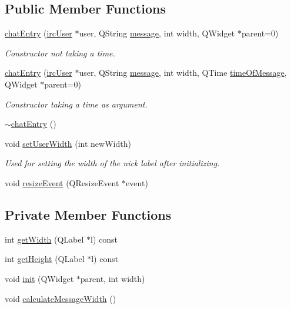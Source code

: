 \subsection*{Public Member Functions}
\begin{DoxyCompactItemize}
\item 
\hyperlink{classclient_1_1chat_entry_a242327cb4a358fdbc182147d2fadf00c}{chat\-Entry} (\hyperlink{classclient_1_1irc_user}{irc\-User} $\ast$user, Q\-String \hyperlink{classclient_1_1chat_entry_acfae1b7b634153673eae05866945cba8}{message}, int width, Q\-Widget $\ast$parent=0)
\begin{DoxyCompactList}\small\item\em Constructor not taking a time. \end{DoxyCompactList}\item 
\hyperlink{classclient_1_1chat_entry_a0e3b3fa3e530a8ddfe86c2c714620dc3}{chat\-Entry} (\hyperlink{classclient_1_1irc_user}{irc\-User} $\ast$user, Q\-String \hyperlink{classclient_1_1chat_entry_acfae1b7b634153673eae05866945cba8}{message}, int width, Q\-Time \hyperlink{classclient_1_1chat_entry_a935d9a9755f8c46eb97723ba296c2b30}{time\-Of\-Message}, Q\-Widget $\ast$parent=0)
\begin{DoxyCompactList}\small\item\em Constructor taking a time as argument. \end{DoxyCompactList}\item 
\hyperlink{classclient_1_1chat_entry_ac85afd36a4a9efc6dc91905461f2e2e0}{$\sim$chat\-Entry} ()
\item 
void \hyperlink{classclient_1_1chat_entry_ac3d69f6791e2497c86fe99c068b832b6}{set\-User\-Width} (int new\-Width)
\begin{DoxyCompactList}\small\item\em Used for setting the width of the nick label after initializing. \end{DoxyCompactList}\item 
void \hyperlink{classclient_1_1chat_entry_a853a6468432e8f44e66d335b9dc7ece9}{resize\-Event} (Q\-Resize\-Event $\ast$event)
\end{DoxyCompactItemize}
\subsection*{Private Member Functions}
\begin{DoxyCompactItemize}
\item 
int \hyperlink{classclient_1_1chat_entry_a23b44a93f980e59387a289c9282b5f78}{get\-Width} (Q\-Label $\ast$l) const 
\item 
int \hyperlink{classclient_1_1chat_entry_aacb386fcc022798feb9dd02b43d56861}{get\-Height} (Q\-Label $\ast$l) const 
\item 
void \hyperlink{classclient_1_1chat_entry_a153e1d0693c3069839e04878844b431f}{init} (Q\-Widget $\ast$parent, int width)
\item 
void \hyperlink{classclient_1_1chat_entry_ae663e1a715924f6743c7e9d235ad334b}{calculate\-Message\-Width} ()
\end{DoxyCompactItemize}
